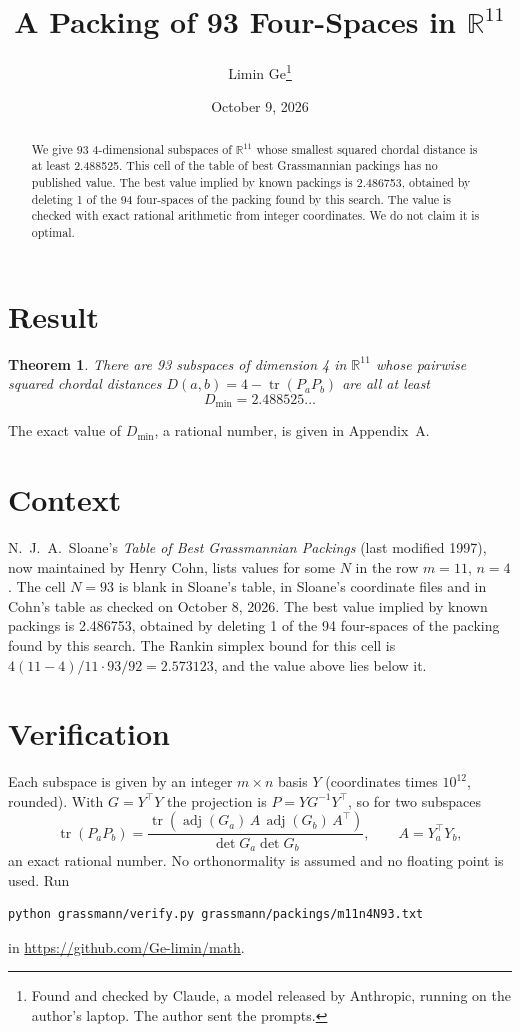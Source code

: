 \documentclass[11pt,a4paper]{article}
\title{A Packing of 93 Four-Spaces in $\mathbb{R}^{11}$}
\author{Limin Ge\thanks{Found and checked by Claude, a model released by Anthropic, running on the author's laptop. The author sent the prompts.}}
\date{October 9, 2026}
\newtheorem*{theorem}{Theorem}
\begin{document}
\maketitle
\begin{abstract}
We give 93 4-dimensional subspaces of $\mathbb{R}^{11}$ whose smallest squared chordal distance is at least 2.488525. This cell of the table of best Grassmannian packings has no published value. The best value implied by known packings is 2.486753, obtained by deleting 1 of the 94 four-spaces of the packing found by this search. The value is checked with exact rational arithmetic from integer coordinates. We do not claim it is optimal.
\end{abstract}

\section{Result}
\begin{theorem}
There are 93 subspaces of dimension 4 in $\mathbb{R}^{11}$ whose pairwise squared chordal distances $D(a,b) = 4 - \operatorname{tr}(P_aP_b)$ are all at least
\[ D_{\min} = 2.488525\ldots \]
\end{theorem}
The exact value of $D_{\min}$, a rational number, is given in Appendix~A.


\section{Context}
N.~J.~A.~Sloane's \emph{Table of Best Grassmannian Packings} (last modified 1997), now maintained by Henry Cohn, lists values for some $N$ in the row $m=11$, $n=4$. The cell $N=93$ is blank in Sloane's table, in Sloane's coordinate files and in Cohn's table as checked on October 8, 2026. The best value implied by known packings is 2.486753, obtained by deleting 1 of the 94 four-spaces of the packing found by this search. The Rankin simplex bound for this cell is $4(11-4)/11\cdot 93/92 = 2.573123$, and the value above lies below it.


\section{Verification}
Each subspace is given by an integer $m\times n$ basis $Y$ (coordinates times $10^{12}$, rounded). With $G=Y^\top Y$ the projection is $P=YG^{-1}Y^\top$, so for two subspaces
\[ \operatorname{tr}(P_aP_b)=\frac{\operatorname{tr}(\operatorname{adj}(G_a)\,A\,\operatorname{adj}(G_b)\,A^\top)}{\det G_a\det G_b},\qquad A=Y_a^\top Y_b, \]
an exact rational number. No orthonormality is assumed and no floating point is used. Run
\begin{verbatim}
python grassmann/verify.py grassmann/packings/m11n4N93.txt
\end{verbatim}
in \url{https://github.com/Ge-limin/math}.
\end{document}
